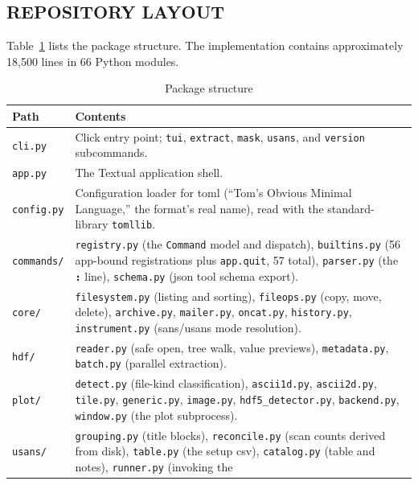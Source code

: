 \documentclass[tm]{ornltm}
\newcommand{\key}[1]{\textbf{\texttt{#1}}}
\begin{document}
\subsection{REPOSITORY LAYOUT}

Table~\ref{tab:layout} lists the package structure. The implementation contains
approximately 18,500 lines in 66 Python modules.

\begin{table}[ht]
  \centering
  \caption{Package structure}
  \label{tab:layout}
  \small
  \begin{tabular}{l p{}}
    \toprule
    Path & Contents \\
    \midrule
    \texttt{cli.py} & Click entry point; \texttt{tui}, \texttt{extract},
      \texttt{mask}, \texttt{usans}, and \texttt{version} subcommands. \\
    \texttt{app.py} & The Textual application shell. \\
    \texttt{config.py} & Configuration loader for \ac{toml}
      \autocite{toml} (``Tom's Obvious Minimal Language,'' the format's real
      name), read with the standard-library \texttt{tomllib}. \\
    \texttt{commands/} & \texttt{registry.py} (the \texttt{Command} model and
      dispatch), \texttt{builtins.py} (56 app-bound registrations plus
      \texttt{app.quit}, 57 total),
      \texttt{parser.py} (the \key{:} line), \texttt{schema.py} (\ac{json} tool
      schema export). \\
    \texttt{core/} & \texttt{filesystem.py} (listing and sorting),
      \texttt{fileops.py} (copy, move, delete), \texttt{archive.py},
      \texttt{mailer.py}, \texttt{oncat.py}, \texttt{history.py},
      \texttt{instrument.py} (\ac{sans}/\ac{usans} mode resolution). \\
    \texttt{hdf/} & \texttt{reader.py} (safe open, tree walk, value previews),
      \texttt{metadata.py}, \texttt{batch.py} (parallel extraction). \\
    \texttt{plot/} & \texttt{detect.py} (file-kind classification),
      \texttt{ascii1d.py}, \texttt{ascii2d.py}, \texttt{tile.py},
      \texttt{generic.py}, \texttt{image.py}, \texttt{hdf5\_detector.py},
      \texttt{backend.py}, \texttt{window.py} (the plot subprocess). \\
    \texttt{usans/} & \texttt{grouping.py} (title blocks), \texttt{reconcile.py}
      (scan counts derived from disk), \texttt{table.py} (the setup \ac{csv}),
      \texttt{catalog.py} (table and notes), \texttt{runner.py} (invoking the

\end{tabular}
\end{table}
\end{document}
